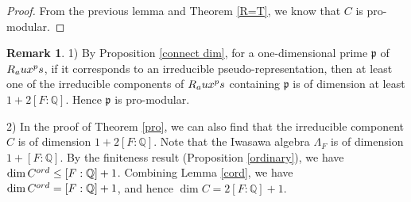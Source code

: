 \documentclass[12pt]{amsart}
\theoremstyle{plain}
\theoremstyle{definition}
\newtheorem{rem}[thm]{Remark}
\theoremstyle{remark}
\begin{document}
\begin{proof}
	From the previous lemma and Theorem \ref{R=T}, we know that $C$ is pro-modular.
	
\end{proof}

\begin{rem}\label{reason}
	1)  By Proposition \ref{connect dim}, for a one-dimensional prime $\mathfrak{p}$ of $R_\textnormal{aux}^\textnormal{ps} $, if it corresponds to an irreducible pseudo-representation, then at least one of the irreducible components of $R_\textnormal{aux}^\textnormal{ps} $ containing $\mathfrak{p}$ is of dimension at least $1+2[F:\mathbb{Q}]$. Hence $\mathfrak{p}$ is pro-modular.
	
	2) In the proof of Theorem \ref{pro}, we can also find that the irreducible component $C$ is of dimension $1+2[F:\mathbb{Q}]$. Note that the Iwasawa algebra $\Lambda_F$ is of dimension $1+[F:\mathbb{Q}]$. By the finiteness result (Proposition \ref{ordinary}), we have $\operatorname{dim} C^{\textnormal{ord}} \le [F:\mathbb{Q}]+1$. Combining Lemma \ref{cord}, we have $\operatorname{dim} C^{\textnormal{ord}} = [F:\mathbb{Q}]+1$, and hence $ \operatorname{dim} C = 2[F:\mathbb{Q}]+1$.
	
\end{rem}
\end{document}
